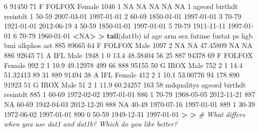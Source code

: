 \documentclass[
]{book}
\newenvironment{Shaded}{\begin{snugshade}}{\end{snugshade}}
\newcommand{\CommentTok}[1]{\textcolor[rgb]{0.56,0.35,0.01}{\textit{#1}}}
\newcommand{\DecValTok}[1]{\textcolor[rgb]{0.00,0.00,0.81}{#1}}
\newcommand{\ErrorTok}[1]{\textcolor[rgb]{0.64,0.00,0.00}{\textbf{#1}}}
\newcommand{\FloatTok}[1]{\textcolor[rgb]{0.00,0.00,0.81}{#1}}
\newcommand{\KeywordTok}[1]{\textcolor[rgb]{0.13,0.29,0.53}{\textbf{#1}}}
\newcommand{\NormalTok}[1]{#1}
\newcommand{\OperatorTok}[1]{\textcolor[rgb]{0.81,0.36,0.00}{\textbf{#1}}}
\newcommand{\OtherTok}[1]{\textcolor[rgb]{0.56,0.35,0.01}{#1}}
\newcommand{\StringTok}[1]{\textcolor[rgb]{0.31,0.60,0.02}{#1}}
\begin{document}
\begin{Shaded}
\begin{Highlighting}[]
\DecValTok{6} \DecValTok{91450}  \DecValTok{71}\NormalTok{ F FOLFOX Female   }\DecValTok{1046}      \DecValTok{1} \OtherTok{NA}   \OtherTok{NA}  \OtherTok{NA}      \OtherTok{NA}  \OtherTok{NA}          \DecValTok{1}
\NormalTok{  ageord    birthdt   resintdt}
\DecValTok{1}  \DecValTok{50-59} \DecValTok{2007-03-01} \DecValTok{1997-01-01}
\DecValTok{2}  \DecValTok{60-69} \DecValTok{1850-01-01} \DecValTok{1997-01-01}
\DecValTok{3}  \DecValTok{70-79} \DecValTok{1921-01-01} \DecValTok{2012-06-19}
\DecValTok{4}  \DecValTok{50-59} \DecValTok{1850-01-01} \DecValTok{1997-01-01}
\DecValTok{5}  \DecValTok{70-79} \DecValTok{1911-11-11} \DecValTok{1997-01-01}
\DecValTok{6}  \DecValTok{70-79} \DecValTok{1960-01-01}       \OperatorTok{<}\OtherTok{NA}\OperatorTok{>}
\ErrorTok{>}\StringTok{ }\KeywordTok{tail}\NormalTok{(dat1b)}
\NormalTok{       id age      arm    sex futime fustat ps  hgb      bmi alkphos ast}
\DecValTok{885} \DecValTok{89665}  \DecValTok{64}\NormalTok{ F FOLFOX   Male   }\DecValTok{1097}      \DecValTok{2} \OtherTok{NA}   \OtherTok{NA} \FloatTok{47.45809}      \OtherTok{NA}  \OtherTok{NA}
\DecValTok{886} \DecValTok{92645}  \DecValTok{71}\NormalTok{    A IFL   Male   }\DecValTok{1948}      \DecValTok{1}  \DecValTok{0} \FloatTok{13.4} \FloatTok{48.38404}      \DecValTok{56}  \DecValTok{25}
\DecValTok{887} \DecValTok{94378}  \DecValTok{69}\NormalTok{ F FOLFOX Female    }\DecValTok{992}      \DecValTok{2}  \DecValTok{1} \FloatTok{10.9} \FloatTok{49.12978}     \DecValTok{499}  \DecValTok{66}
\DecValTok{888} \DecValTok{95155}  \DecValTok{50}\NormalTok{   G IROX   Male    }\DecValTok{752}      \DecValTok{2}  \DecValTok{1} \FloatTok{14.4} \FloatTok{51.32413}      \DecValTok{89}  \DecValTok{31}
\DecValTok{889} \DecValTok{91494}  \DecValTok{38}\NormalTok{    A IFL Female    }\DecValTok{412}      \DecValTok{2}  \DecValTok{1} \FloatTok{10.1} \FloatTok{53.00776}      \DecValTok{94} \DecValTok{178}
\DecValTok{890} \DecValTok{91923}  \DecValTok{51}\NormalTok{   G IROX   Male     }\DecValTok{51}      \DecValTok{2}  \DecValTok{1} \FloatTok{11.9} \FloatTok{60.24257}     \DecValTok{163}  \DecValTok{58}
\NormalTok{    mdqualitys ageord    birthdt   resintdt}
\DecValTok{885}          \DecValTok{1}  \DecValTok{60-69} \DecValTok{1972-02-02} \DecValTok{1997-01-01}
\DecValTok{886}          \DecValTok{1}  \DecValTok{70-79} \DecValTok{1968-05-05} \DecValTok{2012-11-21}
\DecValTok{887}         \OtherTok{NA}  \DecValTok{60-69} \DecValTok{1942-04-03} \DecValTok{2012-12-20}
\DecValTok{888}         \OtherTok{NA}  \DecValTok{40-49} \DecValTok{1970-07-16} \DecValTok{1997-01-01}
\DecValTok{889}          \DecValTok{1}  \DecValTok{30-39} \DecValTok{1972-06-02} \DecValTok{1997-01-01}
\DecValTok{890}          \DecValTok{0}  \DecValTok{50-59} \DecValTok{1949-12-31} \DecValTok{1997-01-01}
\OperatorTok{>}\StringTok{ }
\ErrorTok{>}\StringTok{ }\CommentTok{# What differs when you use dat1 and dat1b?  Which do you like better?}
\end{Highlighting}
\end{Shaded}
\end{document}
